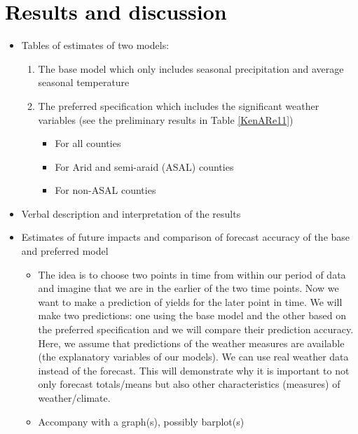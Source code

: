 \documentclass[a4paper,12pt]{article}
\begin{document}
	\section{\textcolor{black}{Results and discussion}}\label{Results}


\color{blue}
\begin{itemize}

\item Tables of estimates of two models:

\begin{enumerate}
\item The base model which only includes seasonal precipitation and average seasonal temperature
\item The preferred specification which includes the significant weather variables (see the preliminary results in Table \ref{KenARe11}) 

\begin{itemize}
\item For all counties 
\item For Arid and semi-araid (ASAL) counties
\item For non-ASAL counties
\end{itemize}

\end{enumerate}
\item Verbal description and interpretation of the results
\item Estimates of future impacts and comparison of forecast accuracy of the base and preferred model

\begin{itemize}

\item The idea is to choose two points in time from within our period of data and imagine that we are in the earlier of the two time points. Now we want to make a prediction of yields for the later point in time. We will make two predictions: one using the base model and the other based on the preferred specification and we will compare their prediction accuracy. Here, we assume that predictions of the weather measures are available (the explanatory variables of our models). We can use real weather data instead of the forecast. This will demonstrate why it is important to not only forecast totals/means but also other characteristics (measures) of weather/climate.
		\item Accompany with a graph(s), possibly barplot(s)
\end{itemize}


\end{itemize}
\end{document}
